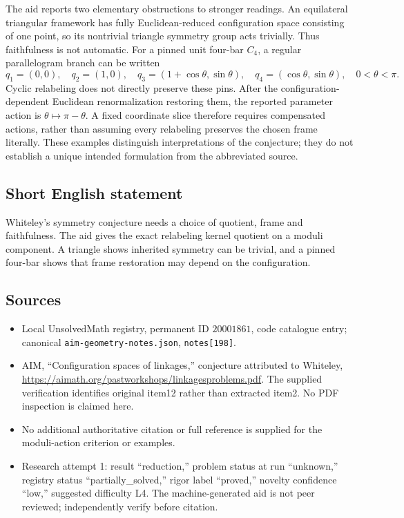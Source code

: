 \documentclass[11pt]{article}
\begin{document}
The aid reports two elementary obstructions to stronger readings. An equilateral triangular framework has fully Euclidean-reduced configuration space consisting of one point, so its nontrivial triangle symmetry group acts trivially. Thus faithfulness is not automatic. For a pinned unit four-bar \(C_4\), a regular parallelogram branch can be written
\[
 q_1=(0,0),\quad q_2=(1,0),\quad
 q_3=(1+\cos\theta,\sin\theta),\quad
 q_4=(\cos\theta,\sin\theta),\quad0<\theta<\pi.
\]
Cyclic relabeling does not directly preserve these pins. After the configuration-dependent Euclidean renormalization restoring them, the reported parameter action is \(\theta\mapsto\pi-\theta\). A fixed coordinate slice therefore requires compensated actions, rather than assuming every relabeling preserves the chosen frame literally. These examples distinguish interpretations of the conjecture; they do not establish a unique intended formulation from the abbreviated source.
\subsection{Short English statement}
Whiteley's symmetry conjecture needs a choice of quotient, frame and faithfulness. The aid gives the exact relabeling kernel quotient on a moduli component. A triangle shows inherited symmetry can be trivial, and a pinned four-bar shows that frame restoration may depend on the configuration.
\subsection{Sources}
\begin{itemize}
\item Local UnsolvedMath registry, permanent ID \(20001861\), code catalogue entry; canonical \texttt{aim-geometry-notes.json}, \texttt{notes[198]}.
\item AIM, ``Configuration spaces of linkages,'' conjecture attributed to Whiteley, \url{https://aimath.org/pastworkshops/linkagesproblems.pdf}. The supplied verification identifies original item12 rather than extracted item2. No PDF inspection is claimed here.
\item No additional authoritative citation or full reference is supplied for the moduli-action criterion or examples.
\item Research attempt 1: result ``reduction,'' problem status at run ``unknown,'' registry status ``partially\_solved,'' rigor label ``proved,'' novelty confidence ``low,'' suggested difficulty L4. The machine-generated aid is not peer reviewed; independently verify before citation.
\end{itemize}
\end{document}
